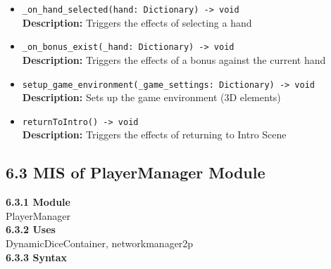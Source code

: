 \documentclass[12pt, titlepage]{article}
\begin{document}
\begin{itemize}
    \item \texttt{\_on\_hand\_selected(hand: Dictionary) -> void}\\
    \textbf{Description:} Triggers the effects of selecting a hand
    
    \item \texttt{\_on\_bonus\_exist(\_hand: Dictionary) -> void}\\
    \textbf{Description:} Triggers the effects of a bonus against the current hand
    
    \item \texttt{setup\_game\_environment(\_game\_settings: Dictionary) -> void}\\
    \textbf{Description:} Sets up the game environment (3D elements)
    
    \item \texttt{returnToIntro() -> void}\\
    \textbf{Description:} Triggers the effects of returning to Intro Scene
\end{itemize}

\subsection*{6.3 MIS of PlayerManager Module}
\textbf{6.3.1 Module}\\
 PlayerManager\\

\noindent \textbf{6.3.2 Uses}\\
DynamicDiceContainer,  networkmanager2p\\

\noindent \textbf{6.3.3 Syntax}
\end{document}
